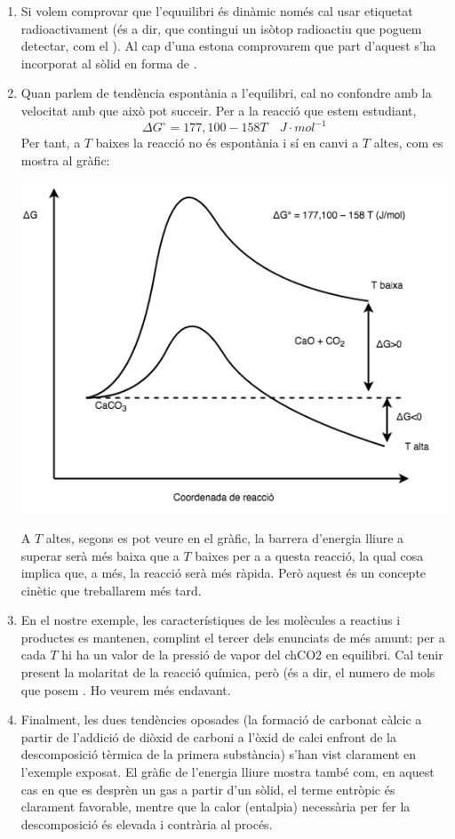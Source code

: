 \begin{enumerate}
\item Si volem comprovar que l'equuilibri és dinàmic només cal usar  etiquetat radioactivament (és a dir, que contingui un isòtop radioactiu que poguem detectar, com el ). Al cap d'una estona comprovarem que part d'aquest  s'ha incorporat al sòlid en forma de .
\item Quan parlem de tendència espontània a l'equilibri, cal no confondre amb la velocitat amb que això pot succeir. Per a la reacció que estem estudiant,
\[
\Delta G^{\circ} = 177,100 − 158 T \quad J \cdot mol^{-1}
\]
Per tant, a $T$ baixes la reacció no és espontània i sí en canvi a $T$ altes, com es mostra al gràfic:
\begin{center}
\includegraphics[scale=0.6]{figures/CaCO3_dG.png}
\end{center}
A $T$ altes, segons es pot veure en el gràfic, la barrera d'energia lliure a superar serà més baixa que a $T$ baixes per a a questa reacció, la qual cosa implica que, a més, la reacció serà més ràpida. Però aquest és un concepte cinètic que treballarem més tard.
\item En el nostre exemple, les característiques de les molècules a reactius i productes es mantenen, complint el tercer dels enunciats de més amunt: per a cada $T$ hi ha un valor de la pressió de vapor del ch{CO2} en equilibri. Cal tenir present la molaritat de la reacció química, però (és a dir, el numero de mols que posem . Ho veurem més endavant.
\item Finalment, les dues tendències oposades (la formació de carbonat càlcic a partir de l'addició de diòxid de carboni a l'òxid de calci enfront de la descomposició tèrmica de la primera substància) s'han vist clarament en l'exemple exposat. El gràfic de l'energia lliure mostra també com, en aquest cas en que es desprèn un gas a partir d'un sòlid, el terme entròpic és clarament favorable, mentre que la calor (entalpia) necessària per fer la descomposició és elevada i contrària al procés.
\end{enumerate}

